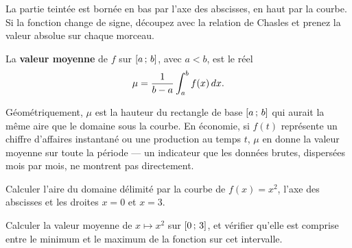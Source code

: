 \begin{visualisation}
\begin{center}
\end{center}

La partie teintée est bornée en bas par l'axe des abscisses, en haut par la
courbe. Si la fonction change de signe, découpez avec la relation de Chasles
et prenez la valeur absolue sur chaque morceau.
\end{visualisation}

\begin{definition}
La \textbf{valeur moyenne} de $f$ sur $\left[a\,;\,b\right]$, avec $a<b$, est le
réel
\[
  \mu = \frac{1}{b-a}\int_{a}^{b} f(x)\,dx .
\]
\end{definition}

\begin{remarque}
Géométriquement, $\mu$ est la hauteur du rectangle de base $\left[a\,;\,b\right]$
qui aurait la même aire que le domaine sous la courbe. En économie, si $f(t)$
représente un chiffre d'affaires instantané ou une production au temps $t$,
$\mu$ en donne la valeur moyenne sur toute la période — un indicateur que les
données brutes, dispersées mois par mois, ne montrent pas directement.
\end{remarque}

\begin{entrainement}
\exo[\niveau{1}] Calculer l'aire du domaine délimité par la courbe de
$f(x) = x^{2}$, l'axe des abscisses et les droites $x=0$ et $x=3$.

\exo[\niveau{2}] Calculer la valeur moyenne de $x \mapsto x^{2}$ sur
$\left[0\,;\,3\right]$, et vérifier qu'elle est comprise entre le minimum et le
maximum de la fonction sur cet intervalle.
\end{entrainement}

